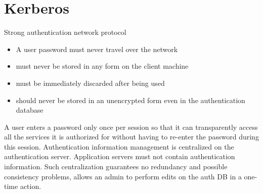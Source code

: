 \section{Kerberos}
Strong authentication network protocol
\begin{itemize}
    \item A user password must never travel over the network
    \item must never be stored in any form on the client machine
    \item must be immediately discarded after being used
    \item should never be stored in an unencrypted form even in the authentication database
\end{itemize}
A user enters a password only once per session so that it can transparently access all the
services it is authorized for without having to re-enter the password during this session.
Authentication information management is centralized on the authentication server.
Application servers must not contain authentication information.
Such centralization guarantees no redundancy and possible consistency problems,
allows an admin to perform edits on the auth DB in a one-time action.

